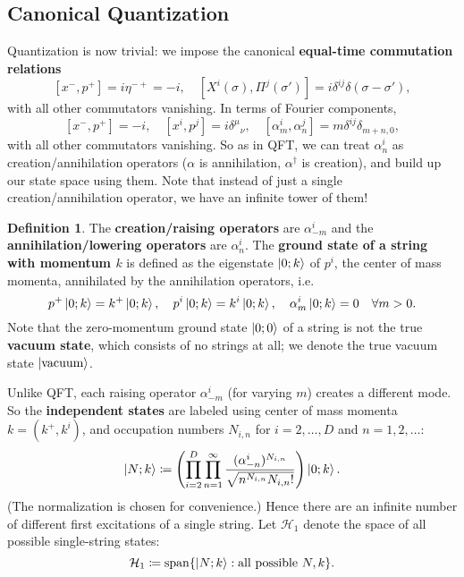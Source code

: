 \documentclass{report}
\theoremstyle{plain}
\theoremstyle{definition}
\newtheorem{definition}[theorem]{Definition}
\theoremstyle{remark}
\newcommand{\cH}{\mathcal{H}}
\DeclareMathOperator{\vspan}{span}
\newcommand{\vacuum}{\text{vacuum}}
\begin{document}
\subsection{Canonical Quantization}

Quantization is now trivial: we impose the canonical {\bf equal-time
  commutation relations}
\[ [x^-, p^+] = i\eta^{-+} = -i, \quad [X^i(\sigma), \Pi^j(\sigma')] = i\delta^{ij} \delta(\sigma - \sigma'), \]
with all other commutators vanishing. In terms of Fourier components,
\[ [x^-, p^+] = -i, \quad [x^i, p^j] = i\delta^\mu{}_\nu, \quad [\alpha^i_m, \alpha^j_n] = m \delta^{ij} \delta_{m+n,0}, \]
with all other commutators vanishing. So as in QFT, we can treat
$\alpha^i_n$ as creation/annihilation operators ($\alpha$ is annihilation, $\alpha^\dag$ is creation), and build up our
state space using them. Note that instead of just a single
creation/annihilation operator, we have an infinite tower of them!

\begin{definition}
  The {\bf creation/raising operators} are $\alpha^i_{-m}$ and the
  {\bf annihilation/lowering operators} are $\alpha^i_n$. The {\bf
    ground state of a string with momentum $k$} is defined as the
  eigenstate $\ket{0; k}$ of $p^i$, the center of mass momenta,
  annihilated by the annihilation operators, i.e.
  \[ p^+\ket{0; k} = k^+\ket{0; k}, \quad p^i\ket{0; k} = k^i\ket{0; k}, \quad \alpha^i_m\ket{0; k} = 0 \quad \forall m > 0. \]
  Note that the zero-momentum ground state $\ket{0; 0}$ of a string is
  not the true {\bf vacuum state}, which consists of no strings at
  all; we denote the true vacuum state $\ket{\vacuum}$.
\end{definition}

Unlike QFT, each raising operator $\alpha^i_{-m}$ (for varying $m$)
creates a different mode. So the {\bf independent states} are labeled
using center of mass momenta $k = (k^+, k^i)$, and occupation numbers
$N_{i,n}$ for $i = 2, \ldots, D$ and $n = 1, 2, \ldots$:
\[ \ket{N; k} \coloneqq \left(\prod_{i=2}^D \prod_{n=1}^\infty \frac{(\alpha^i_{-n})^{N_{i,n}}}{\sqrt{n^{N_{i,n}} N_{i,n}!}}\right) \ket{0; k}. \]
(The normalization is chosen for convenience.) Hence there are an
infinite number of different first excitations of a single string. Let
$\cH_1$ denote the space of all possible single-string states:
\[ \cH_1 \coloneqq \vspan\{\ket{N; k} : \text{all possible } N, k\}. \]
\end{document}
